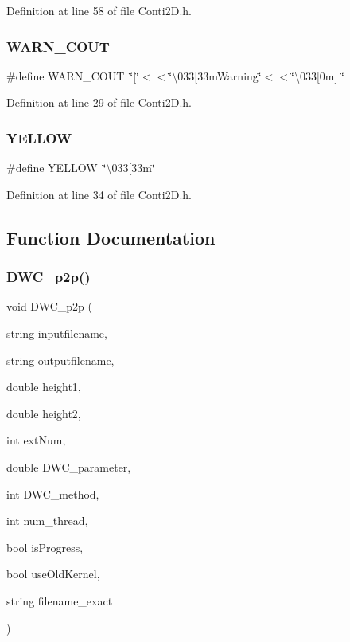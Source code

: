 Definition at line 58 of file Conti2\+D.\+h.

\mbox{\label{Conti2D_8h_a624c50676f68bfc5c188e83c1fb102d3_a624c50676f68bfc5c188e83c1fb102d3}} 
\subsubsection{W\+A\+R\+N\+\_\+\+C\+O\+UT}
{\footnotesize\ttfamily \#define W\+A\+R\+N\+\_\+\+C\+O\+UT~\char`\"{}[\char`\"{}$<$$<$\char`\"{}\textbackslash{}033[33m\+Warning\char`\"{}$<$$<$\char`\"{}\textbackslash{}033[0m] \char`\"{}}



Definition at line 29 of file Conti2\+D.\+h.

\mbox{\label{Conti2D_8h_abf681265909adf3d3e8116c93c0ba179_abf681265909adf3d3e8116c93c0ba179}} 
\subsubsection{Y\+E\+L\+L\+OW}
{\footnotesize\ttfamily \#define Y\+E\+L\+L\+OW~\char`\"{}\textbackslash{}033[33m\char`\"{}}



Definition at line 34 of file Conti2\+D.\+h.



\subsection{Function Documentation}
\mbox{\label{Conti2D_8h_ab87ce573de93575b7ece2e4f772e03fd_ab87ce573de93575b7ece2e4f772e03fd}} 
\subsubsection{D\+W\+C\+\_\+p2p()}
{\footnotesize\ttfamily void D\+W\+C\+\_\+p2p (\begin{DoxyParamCaption}\item[{string}]{inputfilename,  }\item[{string}]{outputfilename,  }\item[{double}]{height1,  }\item[{double}]{height2,  }\item[{int}]{ext\+Num,  }\item[{double}]{D\+W\+C\+\_\+parameter,  }\item[{int}]{D\+W\+C\+\_\+method,  }\item[{int}]{num\+\_\+thread,  }\item[{bool}]{is\+Progress,  }\item[{bool}]{use\+Old\+Kernel,  }\item[{string}]{filename\+\_\+exact }\end{DoxyParamCaption})}




